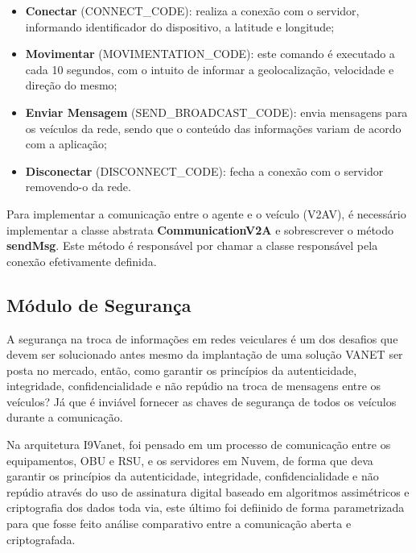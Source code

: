 \documentclass[
	12pt,				%
	oneside,			%
	a4paper,			%
	english,			%
	brazil				%
	]{abntex2ppgsi}
\begin{document}
\begin{itemize}
	\item{\textbf{Conectar} (CONNECT\_CODE): realiza a conexão com o servidor, informando identificador do dispositivo, a latitude e longitude;}	
	\item{\textbf{Movimentar} (MOVIMENTATION\_CODE): este comando é executado a cada 10 segundos, com o intuito de informar a geolocalização, velocidade e direção do mesmo;}	
	\item{\textbf{Enviar Mensagem} (SEND\_BROADCAST\_CODE): envia mensagens para os veículos da rede, sendo que o conteúdo das informações variam de acordo com a aplicação;}	
	\item{\textbf{Disconectar} (DISCONNECT\_CODE): fecha a conexão com o servidor removendo-o da rede.}	
\end{itemize} 

Para implementar a comunicação entre o agente e o veículo (V2AV), é necessário implementar a classe abstrata \textbf{CommunicationV2A} e sobrescrever o método \textbf{sendMsg}. Este método é responsável por chamar a classe responsável pela conexão efetivamente definida.


\subsection{Módulo de Segurança}


A segurança na troca de informações em redes veiculares é um dos desafios que devem ser solucionado antes mesmo da implantação de uma solução VANET ser posta no mercado, então, como garantir os princípios da autenticidade, integridade, confidencialidade e  não repúdio na troca de mensagens entre os veículos? Já que é inviável fornecer as chaves de segurança de todos os veículos durante a comunicação. 

Na arquitetura I9Vanet, foi pensado em um processo de comunicação entre os equipamentos, OBU e RSU, e os servidores em Nuvem, de forma que deva garantir os princípios da autenticidade, integridade, confidencialidade e não repúdio através do uso de assinatura digital baseado em algoritmos assimétricos e criptografia dos dados toda via, este último foi defiinido de forma parametrizada para que fosse feito análise comparativo entre a comunicação aberta e criptografada.
\end{document}
